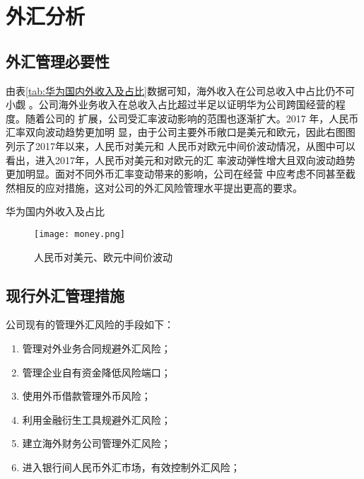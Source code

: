\documentclass[../main]{subfiles}
\begin{document}
\chapter{外汇分析}%
\label{cha:外汇分析}

\section{外汇管理必要性}%
\label{sec:外汇管理必要性}

由表\ref{tab:华为国内外收入及占比}数据可知，海外收入在公司总收入中占比仍不可小觑
。公司海外业务收入在总收入占比超过半足以证明华为公司跨国经营的程度。随着公司的
扩展，公司受汇率波动影响的范围也逐渐扩大。2017 年，人民币汇率双向波动趋势更加明
显，由于公司主要外币敞口是美元和欧元，因此右图图列示了2017年以来，人民币对美元和
人民币对欧元中间价波动情况，从图中可以看出，进入2017年，人民币对美元和对欧元的汇
率波动弹性增大且双向波动趋势更加明显。面对不同外币汇率变动带来的影响，公司在经营
中应考虑不同甚至截然相反的应对措施，这对公司的外汇风险管理水平提出更高的要求。

\begin{table}[htbp]
	\centering
	\caption{华为国内外收入及占比}
	\label{tab:华为国内外收入及占比}
\end{table}

\begin{figure}[htbp]
	\centering
	\texttt{[image: money.png]}
	\caption{人民币对美元、欧元中间价波动}
	\label{fig:人民币对美元、欧元中间价波动}
\end{figure}

\section{现行外汇管理措施}%
\label{sec:现行外汇管理措施}

公司现有的管理外汇风险的手段如下：

\begin{enumerate}

	\item 管理对外业务合同规避外汇风险；

	\item 管理企业自有资金降低风险端口；

	\item 使用外币借款管理外币风险；

	\item 利用金融衍生工具规避外汇风险；

	\item 建立海外财务公司管理外汇风险；

	\item 进入银行间人民币外汇市场，有效控制外汇风险；

\end{enumerate}
\end{document}
